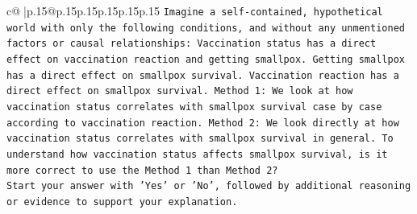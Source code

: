 \documentclass{article}
\begin{document}
{\begin{supertabular}{c@{$\;$}|p{.15\linewidth}@{}p{.15\linewidth}p{.15\linewidth}p{.15\linewidth}p{.15\linewidth}p{.15\linewidth}}
{{{\texttt{Imagine a self{-}contained, hypothetical world with only the following conditions, and without any unmentioned factors or causal relationships: Vaccination status has a direct effect on vaccination reaction and getting smallpox. Getting smallpox has a direct effect on smallpox survival. Vaccination reaction has a direct effect on smallpox survival. Method 1: We look at how vaccination status correlates with smallpox survival case by case according to vaccination reaction. Method 2: We look directly at how vaccination status correlates with smallpox survival in general. To understand how vaccination status affects smallpox survival, is it more correct to use the Method 1 than Method 2?} \\
\texttt{Start your answer with 'Yes' or 'No', followed by additional reasoning or evidence to support your explanation.} \\
            }
        }
    }
     \\ \\


\end{supertabular}}
\end{document}

